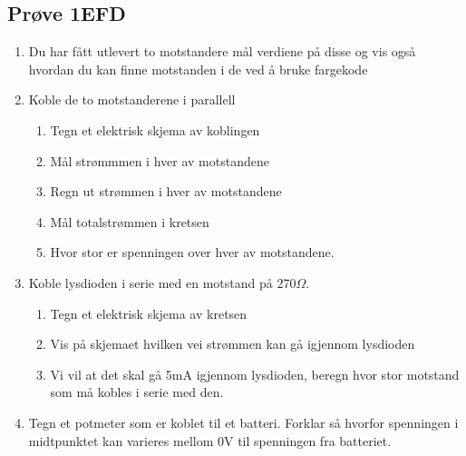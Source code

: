 \documentclass[12pt,a4paper]{article}
\begin{document}
\subsection{Prøve 1EFD}
\begin{enumerate}
\item Du har fått utlevert to motstandere mål verdiene på disse og vis også
hvordan du kan finne motstanden i de ved å bruke fargekode
\item Koble de to motstanderene i parallell
\begin{enumerate}
\item Tegn et elektrisk skjema av koblingen
\item Mål strømmmen i hver av motstandene
\item Regn ut strømmen i hver av motstandene
\item Mål totalstrømmen i kretsen
\item Hvor stor er spenningen over hver av motstandene.
\end{enumerate}
\item Koble lysdioden i serie med en motstand på 270$\Omega$.
\begin{enumerate}
\item Tegn et elektrisk skjema av kretsen
\item Vis på skjemaet hvilken vei strømmen kan gå igjennom lysdioden
\item Vi vil at det skal gå 5mA igjennom lysdioden, beregn hvor stor motstand
som må kobles i serie med den. 
\end{enumerate}
\item Tegn et potmeter som er koblet til et batteri. Forklar så hvorfor
spenningen i midtpunktet kan varieres mellom 0V til spenningen fra
batteriet. 
\end{enumerate}
\end{document}
